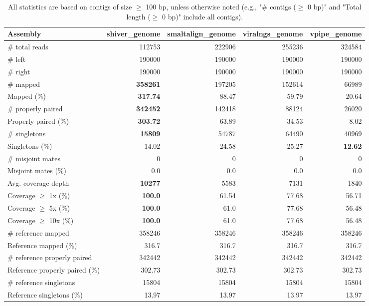 \documentclass[12pt,a4paper]{article}
\begin{document}
\begin{table}[ht]
\begin{center}
\caption{All statistics are based on contigs of size $\geq$ 100 bp, unless otherwise noted (e.g., "\# contigs ($\geq$ 0 bp)" and "Total length ($\geq$ 0 bp)" include all contigs).}
\begin{tabular}{|l*{4}{|r}|}
\hline
Assembly & shiver\_genome & smaltalign\_genome & viralngs\_genome & vpipe\_genome \\ \hline
\# total reads & 112753 & 222906 & 255236 & 324584 \\ \hline
\# left & 190000 & 190000 & 190000 & 190000 \\ \hline
\# right & 190000 & 190000 & 190000 & 190000 \\ \hline
\# mapped & {\bf 358261} & 197205 & 152614 & 66989 \\ \hline
Mapped (\%) & {\bf 317.74} & 88.47 & 59.79 & 20.64 \\ \hline
\# properly paired & {\bf 342452} & 142418 & 88124 & 26020 \\ \hline
Properly paired (\%) & {\bf 303.72} & 63.89 & 34.53 & 8.02 \\ \hline
\# singletons & {\bf 15809} & 54787 & 64490 & 40969 \\ \hline
Singletons (\%) & 14.02 & 24.58 & 25.27 & {\bf 12.62} \\ \hline
\# misjoint mates & 0 & 0 & 0 & 0 \\ \hline
Misjoint mates (\%) & 0.0 & 0.0 & 0.0 & 0.0 \\ \hline
Avg. coverage depth & {\bf 10277} & 5583 & 7131 & 1840 \\ \hline
Coverage $\geq$ 1x (\%) & {\bf 100.0} & 61.54 & 77.68 & 56.71 \\ \hline
Coverage $\geq$ 5x (\%) & {\bf 100.0} & 61.0 & 77.68 & 56.48 \\ \hline
Coverage $\geq$ 10x (\%) & {\bf 100.0} & 61.0 & 77.68 & 56.48 \\ \hline
\# reference mapped & 358246 & 358246 & 358246 & 358246 \\ \hline
Reference mapped (\%) & 316.7 & 316.7 & 316.7 & 316.7 \\ \hline
\# reference properly paired & 342442 & 342442 & 342442 & 342442 \\ \hline
Reference properly paired (\%) & 302.73 & 302.73 & 302.73 & 302.73 \\ \hline
\# reference singletons & 15804 & 15804 & 15804 & 15804 \\ \hline
Reference singletons (\%) & 13.97 & 13.97 & 13.97 & 13.97 \\ \hline

\end{tabular}
\end{center}
\end{table}
\end{document}
